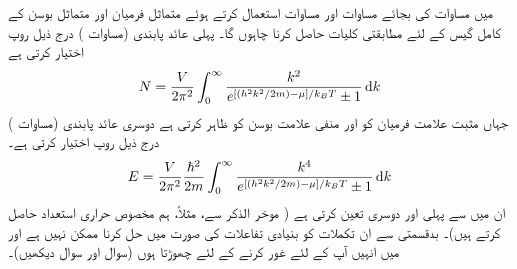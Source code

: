 میں مساوات  کی بجائے مساوات  اور مساوات  استعمال کرتے ہوئے متماثل فرمیان اور متماثل بوسن کے کامل گیس کے لئے مطابقتی کلیات حاصل کرنا چاہوں گا۔ پہلی عائد پابندی (مساوات ) درج ذیل روپ اختیار کرتی ہے 
\begin{align}\label{مساوات_متماثل_فرمیان_تعداد_تکمل}
N = \frac{V}{2 \pi^2} \int_0^{\infty} \frac{k^2}{e^{[(h^2 k^2 /2m) - \mu] / k_B T} \pm 1} \dif k
\end{align}
جہاں مثبت علامت فرمیان کو اور منفی علامت بوسن کو ظاہر کرتی ہے دوسری عائد پابندی (مساوات  ) درج ذیل روپ اختیار کرتی ہے۔
\begin{align}\label{مساوات_متماثل_فرمیان_توانائی_تکمل}
E = \frac{V}{2\pi^2} \frac{\hslash^2}{2m} \int_0^{\infty} \frac{k^4}{e^{[(h^2 k^2 /2m) - \mu] / k_B T} \pm 1} \dif k
\end{align}
ان میں سے پہلی  اور دوسری  تعین کرتی ہے ( موخر الذکر سے، مثلاً، ہم مخصوص حراری استعداد  حاصل کرتے ہیں)۔ بدقسمتی سے ان تکملات کو بنیادی تفاعلات کی صورت میں حل کرنا ممکن نہیں ہے اور میں انہیں آپ کے لئے غور کرنے کے لئے چھوڑتا ہوں (سوال  اور سوال  دیکھیں)۔ 


